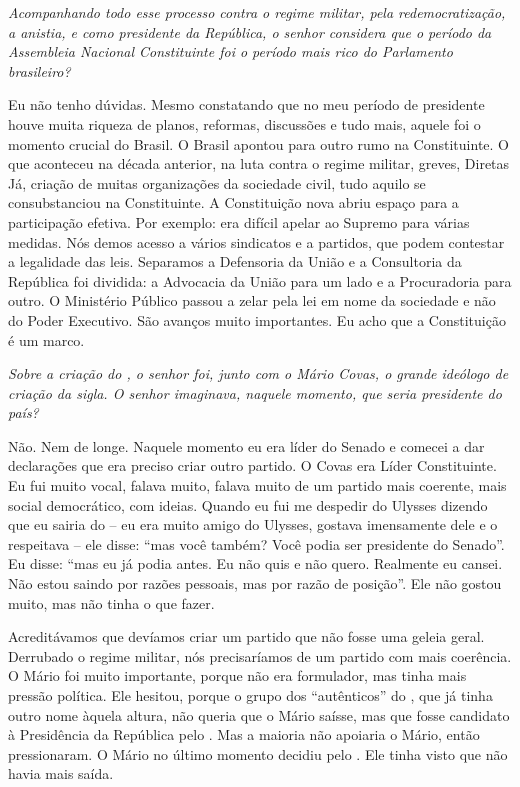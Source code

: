 \medskip

\noindent\emph{Acompanhando todo esse processo contra o regime militar, pela
redemocratização, a anistia, e como presidente da República, o senhor
considera que o período da Assembleia Nacional Constituinte foi o
período mais rico do Parlamento brasileiro?}

Eu não tenho dúvidas. Mesmo constatando que no meu período
de presidente houve muita riqueza de planos, reformas, discussões e tudo
mais, aquele foi o momento crucial do Brasil. O Brasil apontou para
outro rumo na Constituinte. O que aconteceu na década anterior, na luta
contra o regime militar, greves, Diretas Já, criação de muitas
organizações da sociedade civil, tudo aquilo se consubstanciou na
Constituinte. A Constituição nova abriu espaço para a participação
efetiva. Por exemplo: era difícil apelar ao Supremo para várias medidas.
Nós demos acesso a vários sindicatos e a partidos, que podem contestar a
legalidade das leis. Separamos a Defensoria da União e a Consultoria da
República foi dividida: a Advocacia da União para um lado e a
Procuradoria para outro. O Ministério Público passou a zelar pela lei em
nome da sociedade e não do Poder Executivo. São avanços muito
importantes. Eu acho que a Constituição é um marco.

\medskip

\noindent\emph{Sobre a criação do , o senhor foi, junto com o Mário Covas,
o grande ideólogo de criação da sigla. O senhor imaginava, naquele
momento, que seria presidente do país?}

Não. Nem de longe. Naquele momento eu era líder do Senado
e comecei a dar declarações que era preciso criar outro partido. O Covas
era Líder Constituinte. Eu fui muito vocal, falava muito, falava muito
de um partido mais coerente, mais social democrático, com ideias. Quando
eu fui me despedir do Ulysses dizendo que eu sairia do  -- eu era
muito amigo do Ulysses, gostava imensamente dele e o respeitava -- ele
disse: ``mas você também? Você podia ser presidente do Senado''. Eu
disse: ``mas eu já podia antes. Eu não quis e não quero. Realmente eu
cansei. Não estou saindo por razões pessoais, mas por razão de
posição''. Ele não gostou muito, mas não tinha o que fazer.

Acreditávamos que devíamos criar um partido que não fosse uma geleia
geral. Derrubado o regime militar, nós precisaríamos de um partido com
mais coerência. O Mário foi muito importante, porque não era formulador,
mas tinha mais pressão política. Ele hesitou, porque o grupo dos
``autênticos'' do , que já tinha outro nome àquela altura, não queria
que o Mário saísse, mas que fosse candidato à Presidência da República
pelo . Mas a maioria não apoiaria o Mário, então pressionaram. O
Mário no último momento decidiu pelo . Ele tinha visto que não havia
mais saída.

